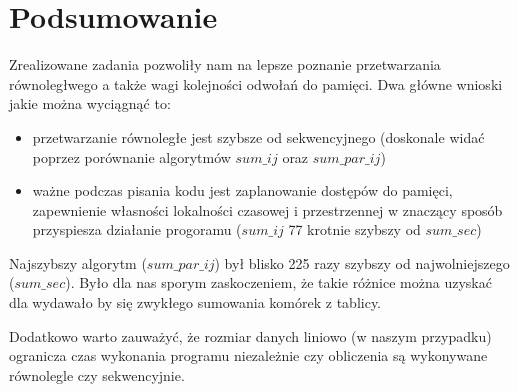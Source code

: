 \section{Podsumowanie}

Zrealizowane zadania pozwoliły nam na lepsze poznanie przetwarzania równoległwego a także wagi kolejności odwołań do pamięci. Dwa główne wnioski jakie można wyciągnąć to:

\begin{itemize}
\item przetwarzanie równoległe jest szybsze od sekwencyjnego (doskonale widać poprzez porównanie algorytmów $sum\_ij$ oraz $sum\_par\_ij$)
\item ważne podczas pisania kodu jest zaplanowanie dostępów do pamięci, zapewnienie własności lokalności czasowej i przestrzennej w znaczący sposób przyspiesza działanie progoramu ($sum\_ij$ 77 krotnie szybszy od $sum\_sec$)
\end{itemize}

Najszybszy algorytm ($sum\_par\_ij$) był blisko 225 razy szybszy od najwolniejszego ($sum\_sec$). Było dla nas sporym zaskoczeniem, że takie różnice można uzyskać dla wydawało by się zwykłego sumowania komórek z tablicy.\newline

Dodatkowo warto zauważyć, że rozmiar danych liniowo (w naszym przypadku) ogranicza czas wykonania programu niezależnie czy obliczenia są wykonywane równolegle czy sekwencyjnie.
